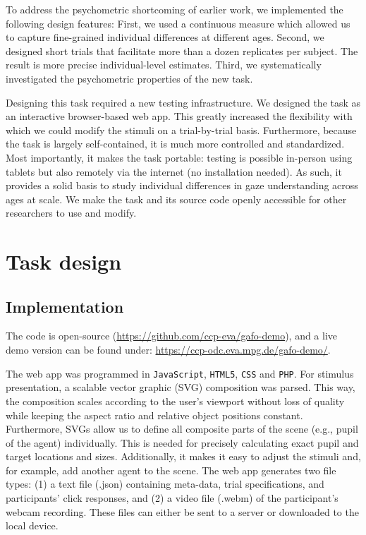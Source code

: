 \documentclass[
  man,floatsintext]{apa6}
\begin{document}
To address the psychometric shortcoming of earlier work, we implemented the following design features: First, we used a continuous measure which allowed us to capture fine-grained individual differences at different ages.
Second, we designed short trials that facilitate more than a dozen replicates per subject.
The result is more precise individual-level estimates.
Third, we systematically investigated the psychometric properties of the new task.

Designing this task required a new testing infrastructure.
We designed the task as an interactive browser-based web app.
This greatly increased the flexibility with which we could modify the stimuli on a trial-by-trial basis.
Furthermore, because the task is largely self-contained, it is much more controlled and standardized.
Most importantly, it makes the task portable: testing is possible in-person using tablets but also remotely via the internet (no installation needed).
As such, it provides a solid basis to study individual differences in gaze understanding across ages at scale.
We make the task and its source code openly accessible for other researchers to use and modify.

\hypertarget{task-design}{%
\section{Task design}\label{task-design}}

\hypertarget{implementation}{%
\subsection{Implementation}\label{implementation}}

The code is open-source (\url{https://github.com/ccp-eva/gafo-demo}), and a live demo version can be found under: \url{https://ccp-odc.eva.mpg.de/gafo-demo/}.

The web app was programmed in \texttt{JavaScript}, \texttt{HTML5}, \texttt{CSS} and \texttt{PHP}.
For stimulus presentation, a scalable vector graphic (SVG) composition was parsed.
This way, the composition scales according to the user's viewport without loss of quality while keeping the aspect ratio and relative object positions constant.
Furthermore, SVGs allow us to define all composite parts of the scene (e.g., pupil of the agent) individually.
This is needed for precisely calculating exact pupil and target locations and sizes.
Additionally, it makes it easy to adjust the stimuli and, for example, add another agent to the scene.
The web app generates two file types: (1) a text file (.json) containing meta-data, trial specifications, and participants' click responses, and (2) a video file (.webm) of the participant's webcam recording.
These files can either be sent to a server or downloaded to the local device.
\end{document}
